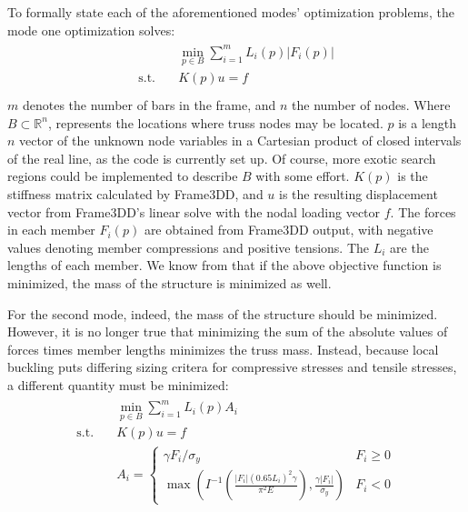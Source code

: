 \documentclass{article}
\begin{document}
To formally state each of the aforementioned modes' optimization problems, the mode one optimization solves:
\begin{align}
\begin{split}
  & \min_{p\in B} \sum_{i=1}^m L_i(p) |F_i(p)| \\
  \text{s.t.} \quad & K(p) u = f \\
\end{split}
\label{eq:mode1}
\end{align}
$m$ denotes the number of bars in the frame, and $n$ the number of nodes.
Where $B \subset \mathbb{R}^n$, represents the locations where truss nodes may be located. $p$ is a length $n$ vector of the unknown
node variables in a Cartesian product of closed intervals of the real line, as the code is currently set up.
Of course, more exotic search regions could be implemented to describe $B$ with some effort. $K(p)$ is
the stiffness matrix calculated by Frame3DD, and $u$ is the resulting displacement vector from Frame3DD's
linear solve with the nodal loading vector $f$. The forces in each member $F_i(p)$ are obtained from
Frame3DD output, with negative values denoting member compressions and positive tensions.
The $L_i$ are the lengths of each member.
We know from \cite{muellerComputationalExplorationStructural2014} that if the above
objective function is minimized, the mass of the structure is minimized as well.

For the second mode, indeed, the mass of the structure should be minimized. However, it
is no longer true that minimizing the sum of the absolute values of forces times member lengths
minimizes the truss mass. Instead, because local buckling puts differing sizing critera for
compressive stresses and tensile stresses, a different quantity must be minimized:
\begin{align}
\begin{split}
  & \min_{p\in B} \sum_{i=1}^m L_i(p) A_i \\
  \text{s.t.} \quad & K(p) u = f \\
                    & A_i = \begin{cases} \gamma F_i / \sigma_y & F_i  \geq 0 \\
                      \max\left(I^{-1}\left(\frac{|F_i| (0.65 L_i)^2 \gamma}{\pi^2 E}\right), \frac{\gamma|F_i|}{\sigma_y}\right) & F_i < 0
                    \end{cases}
\end{split}
\label{eq:mode2}
\end{align}
\end{document}
